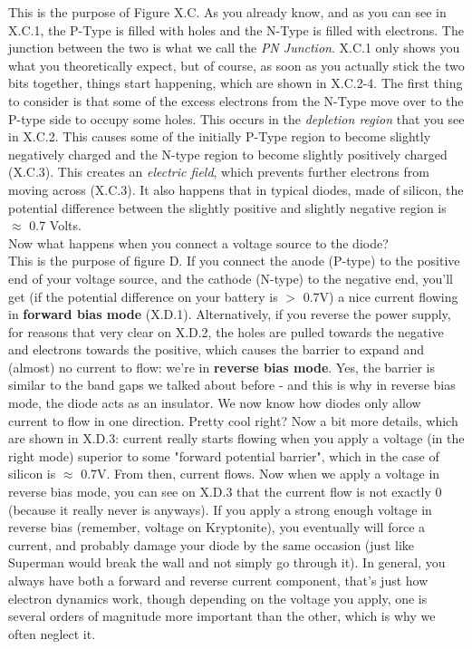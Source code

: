 This is the purpose of Figure X.C. As you already know, and as you can see in X.C.1, the P-Type is filled with holes and the N-Type is filled with electrons. The junction between the two is what we call the \textit{PN Junction}. X.C.1 only shows you what you theoretically expect, but of course, as soon as you actually stick the two bits together, things start happening, which are shown in X.C.2-4. The first thing to consider is that some of the excess electrons from the N-Type move over to the P-type side to occupy some holes. This occurs in the \textit{depletion region} that you see in X.C.2. This causes some of the initially P-Type region to become slightly negatively charged and the N-type region to become slightly positively charged (X.C.3). This creates an \textit{electric field}, which prevents further electrons from moving across (X.C.3). It also happens that in typical diodes, made of silicon, the potential difference between the slightly positive and slightly negative region is $\approx$ 0.7 Volts. \\



Now what happens when you connect a voltage source to the diode? \\

This is the purpose of figure D. If you connect the anode (P-type) to the positive end of your voltage source, and the cathode (N-type) to the negative end, you'll get (if the potential difference on your battery is $>$ 0.7V) a nice current flowing in \textbf{forward bias mode} (X.D.1). Alternatively, if you reverse the power supply, for reasons that very clear on X.D.2, the holes are pulled towards the negative and electrons towards the positive, which causes the barrier to expand and (almost) no current to flow: we're in \textbf{reverse bias mode}. Yes, the barrier is similar to the band gaps we talked about before - and this is why in reverse bias mode, the diode acts as an insulator. We now know how diodes only allow current to flow in one direction. Pretty cool right? Now a bit more details, which are shown in X.D.3: current really starts flowing when you apply a voltage (in the right mode) superior to some "forward potential barrier", which in the case of silicon is $\approx$ 0.7V. From then, current flows. Now when we apply a voltage in reverse bias mode, you can see on X.D.3 that the current flow is not exactly 0 (because it really never is anyways). If you apply a strong enough voltage in reverse bias (remember, voltage on Kryptonite), you eventually will force a current, and probably damage your diode by the same occasion (just like Superman would break the wall and not simply go through it). In general, you always have both a forward and reverse current component, that's just how electron dynamics work, though depending on the voltage you apply, one is several orders of magnitude more important than the other, which is why we often neglect it. 


